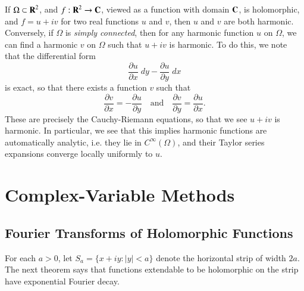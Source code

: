 If $\Omega \subset \operatorname{\mathbf{R}}^2$, and $f: \operatorname{\mathbf{R}}^2 \to \operatorname{\mathbf{C}}$, viewed as a function with domain $\operatorname{\mathbf{C}}$, is holomorphic, and $f = u + i v$ for two real functions $u$ and $v$, then $u$ and $v$ are both harmonic. Conversely, if $\Omega$ is \emph{simply connected}, then for any harmonic function $u$ on $\Omega$, we can find a harmonic $v$ on $\Omega$ such that $u + i v$ is harmonic. To do this, we note that the differential form
%
\[ \frac{\partial u}{\partial x}\; dy - \frac{\partial u}{\partial y}\; dx \]
%
is exact, so that there exists a function $v$ such that
%
\[ \frac{\partial v}{\partial x} = - \frac{\partial u}{\partial y} \quad\text{and}\quad \frac{\partial v}{\partial y} = \frac{\partial u}{\partial x}. \]
%
These are precisely the Cauchy-Riemann equations, so that we see $u + iv$ is harmonic. In particular, we see that this implies harmonic functions are automatically analytic, i.e. they lie in $C^\infty(\Omega)$, and their Taylor series expansions converge locally uniformly to $u$.













\chapter{Complex-Variable Methods}

\section{Fourier Transforms of Holomorphic Functions}

For each $a > 0$, let $S_a = \{ x + iy: |y| < a \}$ denote the horizontal strip of width $2a$. The next theorem says that functions extendable to be holomorphic on the strip have exponential Fourier decay.

